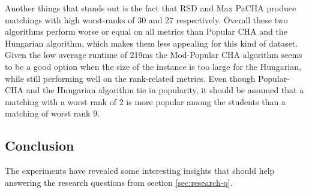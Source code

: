 \begin{table}[h!]
  \centering
  \caption{Average results for large uniform dataset with complete preferences.}
  \label{tab:results-uniform-large-complete}
\end{table}

Another things that stands out is the fact that RSD and Max PaCHA produce matchings with high worst-ranks of 30 and 27 respectively. Overall these two algorithms perform worse or equal on all metrics than Popular CHA and the Hungarian algorithm, which makes them less appealing for this kind of dataset. Given the low average runtime of 219ms the Mod-Popular CHA algorithm seems to be a good option when the size of the instance is too large for the Hungarian, while still performing well on the rank-related metrics. Even though Popular-CHA and the Hungarian algorithm tie in popularity, it should be assumed that a matching with a worst rank of 2 is more popular among the students than a matching of worst rank 9. 

\subsection{Conclusion}
The experiments have revealed some interesting insights that should help answering the research questions from section \ref{sec:research-q}.

